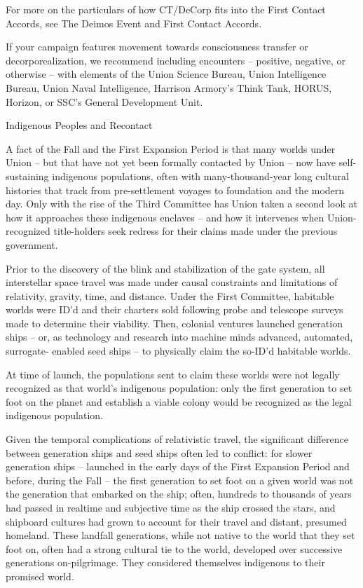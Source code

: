 For more on the particulars of how CT/DeCorp fits into the First Contact Accords, see The  
Deimos Event and First Contact Accords. 
 

If your campaign features movement towards consciousness transfer or decorporealization, we  
recommend including encounters -- positive, negative, or otherwise -- with elements of the  
Union Science Bureau, Union Intelligence Bureau, Union Naval Intelligence, Harrison Armory’s  
Think Tank, HORUS, Horizon, or SSC’s General Development Unit.  
 

                                                                                                               


Indigenous Peoples and Recontact  

A fact of the Fall and the First Expansion Period is that many worlds under Union -- but that have  
not yet been formally contacted by Union -- now have self-sustaining indigenous populations,  
often with many-thousand-year long cultural histories that track from pre-settlement voyages to  
foundation and the modern day. Only with the rise of the Third Committee has Union taken a  
second look at how it approaches these indigenous enclaves -- and how it intervenes when  
Union-recognized title-holders seek redress for their claims made under the previous  
government.  
 

Prior to the discovery of the blink and stabilization of the gate system, all interstellar space travel  
was made under causal constraints and limitations of relativity, gravity, time, and distance. Under  
the First Committee, habitable worlds were ID’d and their charters sold following probe and  
telescope surveys made to determine their viability. Then, colonial ventures launched generation  
ships -- or, as technology and research into machine minds advanced,  automated, surrogate- 
enabled seed ships -- to physically claim the so-ID’d habitable worlds. 
 

At time of launch, the populations sent to claim these worlds were not legally recognized as that  
world’s indigenous population: only the first generation to set foot on the planet and establish a  
viable colony would be recognized as the legal indigenous population. 
 

Given the temporal complications of relativistic travel, the significant difference between  
generation ships and seed ships often led to conflict: for slower generation ships -- launched in  
the early days of the First Expansion Period and before, during the Fall -- the first generation to  
set foot on a given world was not the generation that embarked on the ship; often, hundreds to  
thousands of years had passed in realtime and subjective time as the ship crossed the stars, and  
shipboard cultures had grown to account for their travel and distant, presumed homeland. These  
landfall generations, while not native to the world that they set foot on, often had a strong  
cultural tie to the world, developed over successive generations on-pilgrimage. They considered  
themselves indigenous to their promised world. 
 

